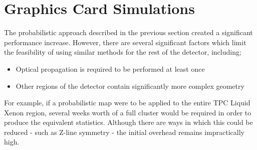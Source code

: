 \section{Graphics Card Simulations}

\par
The probabilistic approach described in the previous section created a significant performance increase. 
However, there are several significant factors which limit the feasibility of using similar methods for the rest of the detector, including;
\begin{itemize}
    \item Optical propagation is required to be performed at least once
    \item Other regions of the detector contain significantly more complex geometry
\end{itemize}
For example, if a probabilistic map were to be applied to the entire TPC Liquid Xenon region, several weeks worth of a full cluster would be required in order to produce the equivalent statistics.
Although there are ways in which this could be reduced - such as Z-line symmetry - the initial overhead remains impractically high.


